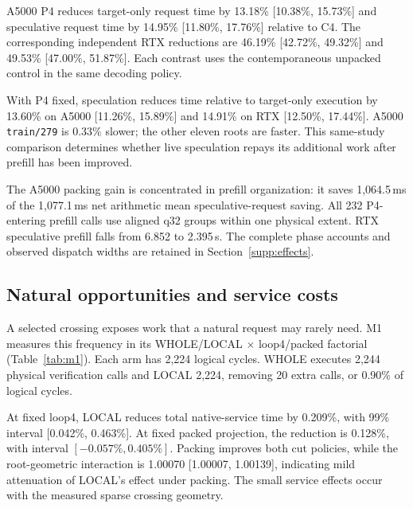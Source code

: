 A5000 P4 reduces target-only request time by 13.18\% [10.38\%, 15.73\%] and speculative request time by 14.95\% [11.80\%, 17.76\%] relative to C4. The corresponding independent RTX reductions are 46.19\% [42.72\%, 49.32\%] and 49.53\% [47.00\%, 51.87\%]. Each contrast uses the contemporaneous unpacked control in the same decoding policy.

With P4 fixed, speculation reduces time relative to target-only execution by 13.60\% on A5000 [11.26\%, 15.89\%] and 14.91\% on RTX [12.50\%, 17.44\%]. A5000 \texttt{train/279} is 0.33\% slower; the other eleven roots are faster. This same-study comparison determines whether live speculation repays its additional work after prefill has been improved.

The A5000 packing gain is concentrated in prefill organization: it saves 1,064.5\,ms of the 1,077.1\,ms net arithmetic mean speculative-request saving. All 232 P4-entering prefill calls use aligned q32 groups within one physical extent. RTX speculative prefill falls from 6.852 to 2.395\,s. The complete phase accounts and observed dispatch widths are retained in Section~\ref{supp:effects}.

\FloatBarrier
\subsection{Natural opportunities and service costs}
\label{sec:natural}
A selected crossing exposes work that a natural request may rarely need. M1 measures this frequency in its WHOLE/LOCAL $\times$ loop4/packed factorial (Table~\ref{tab:m1}). Each arm has 2,224 logical cycles. WHOLE executes 2,244 physical verification calls and LOCAL 2,224, removing 20 extra calls, or 0.90\% of logical cycles.


At fixed loop4, LOCAL reduces total native-service time by 0.209\%, with 99\% interval [0.042\%, 0.463\%]. At fixed packed projection, the reduction is 0.128\%, with interval $[-0.057\%,0.405\%]$. Packing improves both cut policies, while the root-geometric interaction is 1.00070 [1.00007, 1.00139], indicating mild attenuation of LOCAL's effect under packing. The small service effects occur with the measured sparse crossing geometry.

